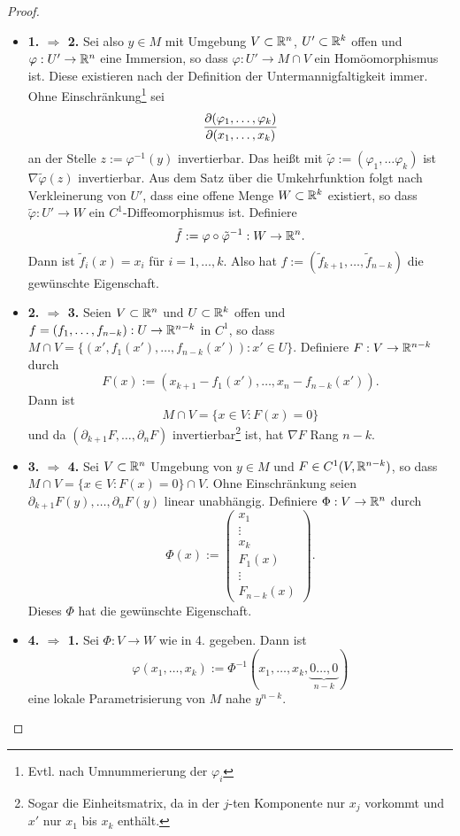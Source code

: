 \begin{proof}
 \begin{itemize}
  \item \textbf{1. $\Rightarrow$ 2.} Sei also $y \in M$ mit Umgebung $V \subset \mathbb{R}^n$, $U' \subset \mathbb{R}^k$ offen und $\varphi: U' \to \mathbb{R}^n$ eine Immersion, so dass $\varphi: U' \to M \cap V$ ein Homöomorphismus ist. Diese existieren nach der Definition der Untermannigfaltigkeit immer. Ohne Einschränkung\footnote{Evtl. nach Umnummerierung der $\varphi_i$} sei
  \[ \frac{\partial  (\varphi_1, \ldots, \varphi_k) }{\partial  (x_1, \ldots, x_k) } \]
  an der Stelle $z := \varphi^{-1}(y)$ invertierbar. Das heißt mit $\tilde{\varphi} := ( \varphi_1, \ldots \varphi_k)$ ist $\nabla \tilde{\varphi}(z)$ invertierbar. Aus dem Satz über die Umkehrfunktion folgt nach Verkleinerung von $U'$, dass eine offene Menge $W \subset \mathbb{R}^k$ existiert, so dass $\tilde{\varphi}: U' \to W$ ein $C^1$-Diffeomorphismus ist. Definiere
  \[ \tilde{f} :=\varphi \circ \tilde{\varphi}^{-1} : W \to \mathbb{R}^n. \]
  Dann ist $\tilde{f}_i(x) = x_i$ für $i = 1, \ldots, k$. Also hat $f := (\tilde{f}_{k+1}, \ldots, \tilde{f}_{n-k})$ die gewünschte Eigenschaft.
  \item \textbf{2. $\Rightarrow$ 3.} Seien $V \subset \mathbb{R}^n$ und $U \subset \mathbb{R}^k$ offen und $f = (f_1, \ldots, f_{n-k}): U \to \mathbb{R}^{n-k}$ in $C^1$, so dass $M \cap V = \{ (x', f_1(x'), \ldots, f_{n-k}(x') ) : x' \in U \}$. Definiere $F: V \to \mathbb{R}^{n-k}$ durch 
  \[ F(x) := ( x_{k+1} - f_1(x'), \ldots, x_n - f_{n-k}(x') ). \]
  Dann ist 
  \[ M \cap V = \{ x \in V : F(x) = 0 \} \]
  und da $(\partial_{k+1} F, \ldots, \partial_n F)$ invertierbar\footnote{Sogar die Einheitsmatrix, da in der $j$-ten Komponente nur $x_j$ vorkommt und $x'$ nur $x_1$ bis $x_k$ enthält.} ist, hat $\nabla F$ Rang $n-k$.
  \item \textbf{3. $\Rightarrow$ 4.} Sei $V \subset \mathbb{R}^n$ Umgebung von $y \in M$ und $F \in C^1(V, \mathbb{R}^{n-k})$, so dass $M \cap V = \{ x \in V : F(x)=0 \} \cap V$. Ohne Einschränkung seien $\partial_{k+1} F(y), \ldots, \partial_n F(y)$ linear unabhängig. Definiere $\Phi: V \to \mathbb{R}^n$ durch
  \[ \Phi(x) := \begin{pmatrix} x_1 \\ \vdots \\ x_k \\ F_1(x) \\ \vdots \\ F_{n-k}(x) \end{pmatrix}. \]
  Dieses $\Phi$ hat die gewünschte Eigenschaft.
  \item \textbf{4. $\Rightarrow$ 1.} Sei $\Phi: V \to W$ wie in 4. gegeben. Dann ist
  \[ \varphi(x_1, \ldots, x_k) := \Phi^{-1}( x_1, \ldots, x_k, \underbrace{0 \ldots, 0}_{n-k} ) \]
  eine lokale Parametrisierung von $M$ nahe $y^{n-k}$. \qedhere
 \end{itemize}
\end{proof}

